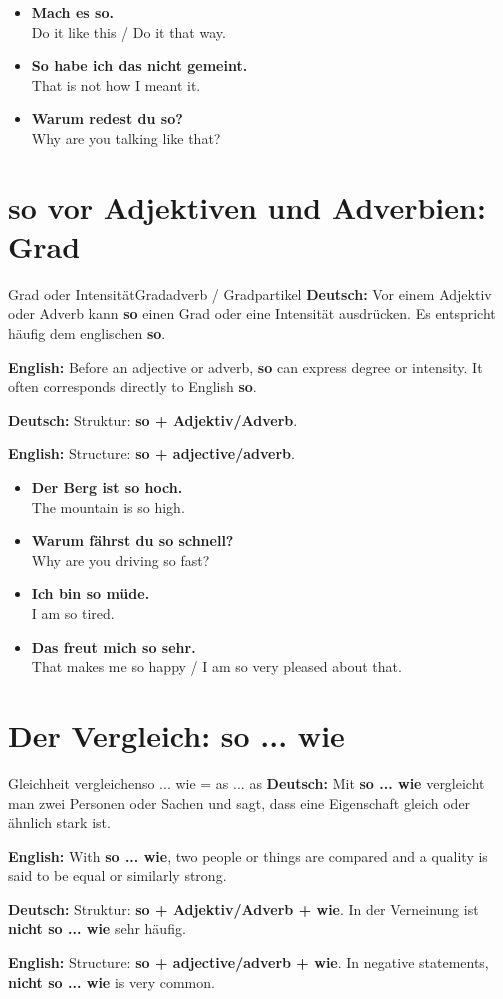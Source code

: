 \documentclass[a4paper,11pt]{article}
\newcommand{\GermanText}[1]{\textbf{Deutsch: }#1\par}
\newcommand{\EnglishText}[1]{{\small\color{SoftGray}\textbf{English: }#1\par}}
\newcommand{\ExampleItem}[2]{\item \textbf{#1}\\{\small\color{SoftGray}#2}}
\begin{document}
        \begin{exbox}
            \begin{itemize}
                \ExampleItem{Mach es so.}{Do it like this / Do it that way.}
                \ExampleItem{So habe ich das nicht gemeint.}{That is not how I meant it.}
                \ExampleItem{Warum redest du so?}{Why are you talking like that?}
            \end{itemize}
        \end{exbox}

    \section{\glqq so\grqq{} vor Adjektiven und Adverbien: Grad}

        \begin{grammarentry}{Grad oder Intensität}{Gradadverb / Gradpartikel}
            \GermanText{Vor einem Adjektiv oder Adverb kann \textbf{so} einen Grad oder eine Intensität ausdrücken. Es entspricht häufig dem englischen \textbf{so}.}
            \EnglishText{Before an adjective or adverb, \textbf{so} can express degree or intensity. It often corresponds directly to English \textbf{so}.}

            \GermanText{Struktur: \textbf{so + Adjektiv/Adverb}.}
            \EnglishText{Structure: \textbf{so + adjective/adverb}.}
        \end{grammarentry}

        \begin{exbox}
            \begin{itemize}
                \ExampleItem{Der Berg ist so hoch.}{The mountain is so high.}
                \ExampleItem{Warum fährst du so schnell?}{Why are you driving so fast?}
                \ExampleItem{Ich bin so müde.}{I am so tired.}
                \ExampleItem{Das freut mich so sehr.}{That makes me so happy / I am so very pleased about that.}
            \end{itemize}
        \end{exbox}

    \section{Der Vergleich: \glqq so ... wie\grqq}

        \begin{grammarentry}{Gleichheit vergleichen}{so ... wie = as ... as}
            \GermanText{Mit \textbf{so ... wie} vergleicht man zwei Personen oder Sachen und sagt, dass eine Eigenschaft gleich oder ähnlich stark ist.}
            \EnglishText{With \textbf{so ... wie}, two people or things are compared and a quality is said to be equal or similarly strong.}

            \GermanText{Struktur: \textbf{so + Adjektiv/Adverb + wie}. In der Verneinung ist \textbf{nicht so ... wie} sehr häufig.}
            \EnglishText{Structure: \textbf{so + adjective/adverb + wie}. In negative statements, \textbf{nicht so ... wie} is very common.}
        \end{grammarentry}
\end{document}
